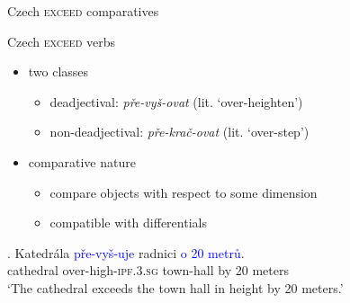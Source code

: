 \documentclass[12pt]{beamer}
\begin{document}
\begin{frame}{Czech \textsc{exceed} comparatives}

Czech \textsc{exceed} verbs

\begin{itemize}
\item two classes
\begin{itemize}
\item deadjectival: \textit{pře-vyš-ovat} (lit. `over-heighten')
\item non-deadjectival: \textit{pře-krač-ovat} (lit. `over-step')
\end{itemize}
\item comparative nature
\begin{itemize}
\item compare objects with respect to some dimension
\item compatible with differentials
\end{itemize}
\end{itemize}

\exg. Katedrála \textcolor{blue}{pře-vyš-uje} radnici \textcolor{blue}{o} \textcolor{blue}{20} \textcolor{blue}{metrů}.\label{ex:ExV-diff}\\
cathedral over-high-\textsc{ipf.3.sg} {town-hall} by 20 meters\\
`The cathedral exceeds the town hall in height by 20 meters.'

\end{frame}
\end{document}
